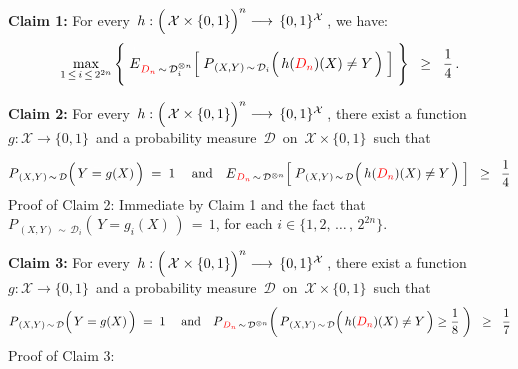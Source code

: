 \vskip 0.5cm
\noindent
\textbf{Claim 1:}\quad
For every
\,$h : \left(\,\mathcal{X}\overset{{\color{white}.}}{\times}\{0,1\}\right)^{n} \longrightarrow \,\{0,1\}^{\mathcal{X}}$\,,
we have:
\begin{equation*}
\underset{1 \,\leq\, i \,\leq\, 2^{2n}}{\max}\left\{\;
	\overset{{\color{white}\vert}}{E}_{{\color{red}D_{n}}\,\sim\,\mathcal{D}_{i}^{\otimes n}}\!\left[\;
		P_{\,(X,Y)\,\sim\,\mathcal{D}_{i}}\!\left(\,h({\color{red}D_{n}})(X) \overset{{\color{white}.}}{\neq} Y\,\right)
		\;\right]
	\;\right\}
	\;\; \geq \;\;
		\dfrac{1}{4}\,.
\end{equation*}

\vskip 1.0cm
\noindent
\textbf{Claim 2:}\quad
For every
\,$h : \left(\,\mathcal{X}\overset{{\color{white}.}}{\times}\{0,1\}\right)^{n} \longrightarrow \,\{0,1\}^{\mathcal{X}}$\,,
there exist a function \,$g : \mathcal{X} \longrightarrow \{0,1\}$\, and
a probability measure \,$\mathcal{D}$\, on \,$\mathcal{X} \times \{0,1\}$\,
such that
\begin{equation*}
P_{\,(X,Y)\,\sim\,\mathcal{D}}\!\left(\,Y \overset{{\color{white}-}}{=} g(X)\,\right) \; = \; 1
\;\quad\textnormal{and}\quad
\overset{{\color{white}\vert}}{E}_{{\color{red}D_{n}}\,\sim\,\mathcal{D}^{\otimes n}}\!\left[\;
	P_{\,(X,Y)\,\sim\,\mathcal{D}}\!\left(\,h({\color{red}D_{n}})(X) \overset{{\color{white}.}}{\neq} Y\,\right)
	\;\right]
\;\; \geq \;\;
	\dfrac{1}{4}
\end{equation*}
Proof of Claim 2:\quad
Immediate by Claim 1 and the fact that \,$P_{\,(X,Y)\,\sim\,\mathcal{D}_{i}}\!\left(\,Y = g_{i}(X)\,\right) \,=\, 1$,
for each $i \in \{1,2,\,\ldots\,,\,2^{2n}\}$.

\vskip 1.0cm
\noindent
\textbf{Claim 3:}\quad
For every
\,$h : \left(\,\mathcal{X}\overset{{\color{white}.}}{\times}\{0,1\}\right)^{n} \longrightarrow \,\{0,1\}^{\mathcal{X}}$\,,
there exist a function \,$g : \mathcal{X} \longrightarrow \{0,1\}$\, and
a probability measure \,$\mathcal{D}$\, on \,$\mathcal{X} \times \{0,1\}$\,
such that
\begin{equation*}
P_{\,(X,Y)\,\sim\,\mathcal{D}}\!\left(\,Y \overset{{\color{white}-}}{=} g(X)\,\right) \; = \; 1
\;\quad\textnormal{and}\quad
\overset{{\color{white}\vert}}{P}_{{\color{red}D_{n}}\,\sim\,\mathcal{D}^{\otimes n}}\!\left(\,
	P_{\,(X,Y)\,\sim\,\mathcal{D}}\!\left(\,h({\color{red}D_{n}})(X) \overset{{\color{white}.}}{\neq} Y\,\right) \geq \dfrac{1}{8}
	\;\right)
\;\; \geq \;\;
	\dfrac{1}{7}
\end{equation*}
Proof of Claim 3:\quad

